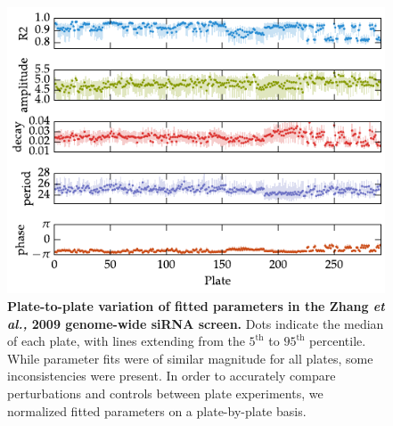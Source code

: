 \documentclass[11pt, letterpaper]{article}
\begin{document}
\begin{figure}[tbp]
  \begin{center}
    \includegraphics[]{figures/pdfs/zhang_plates.pdf}
  \end{center}
  \caption{{\bfseries Plate-to-plate variation of fitted parameters in the Zhang {\itshape et al.,} 2009 genome-wide siRNA screen.} Dots indicate the median of each plate, with lines extending from the $5^\text{th}$ to $95^\text{th}$ percentile. While parameter fits were of similar magnitude for all plates, some inconsistencies were present. In order to accurately compare perturbations and controls between plate experiments, we normalized fitted parameters on a plate-by-plate basis.}
\label{fig:plate_variation}
\end{figure}
\end{document}
